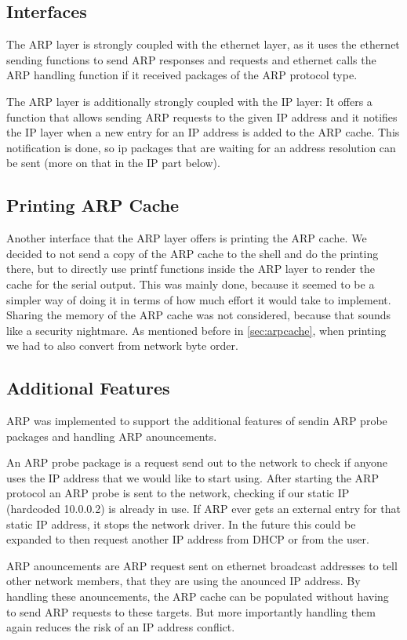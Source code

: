 \subsection{Interfaces}
The ARP layer is strongly coupled with the ethernet layer, as it uses the ethernet sending functions to send ARP responses and requests and ethernet calls the ARP handling function if it received packages of the ARP protocol type.

The ARP layer is additionally strongly coupled with the IP layer: It offers a function that allows sending ARP requests to the given IP address and it notifies the IP layer when a new entry for an IP address is added to the ARP cache. This notification is done, so ip packages that are waiting for an address resolution can be sent (more on that in the IP part below).

\subsection{Printing ARP Cache}
Another interface that the ARP layer offers is printing the ARP cache. We decided to not send a copy of the ARP cache to the shell and do the printing there, but to directly use printf functions inside the ARP layer to render the cache for the serial output. This was mainly done, because it seemed to be a simpler way of doing it in terms of how much effort it would take to implement. Sharing the memory of the ARP cache was not considered, because that sounds like a security nightmare. As mentioned before in \ref{sec:arpcache}, when printing we had to also convert from network byte order.

\subsection{Additional Features}
ARP was implemented to support the additional features of sendin ARP probe packages and handling ARP anouncements.

An ARP probe package is a request send out to the network to check if anyone uses the IP address that we would like to start using. After starting the ARP protocol an ARP probe is sent to the network, checking if our static IP (hardcoded 10.0.0.2) is already in use. If ARP ever gets an external entry for that static IP address, it stops the network driver. In the future this could be expanded to then request another IP address from DHCP or from the user.

ARP anouncements are ARP request sent on ethernet broadcast addresses to tell other network members, that they are using the anounced IP address. By handling these anouncements, the ARP cache can be populated without having to send ARP requests to these targets. But more importantly handling them again reduces the risk of an IP address conflict.

